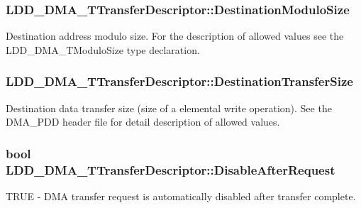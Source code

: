 \subsubsection[{Destination\+Modulo\+Size}]{ L\+D\+D\+\_\+\+D\+M\+A\+\_\+\+T\+Transfer\+Descriptor\+::\+Destination\+Modulo\+Size}\label{struct_l_d_d___d_m_a___t_transfer_descriptor_a2d9a37eb9dc192ae554e0dca033a1e3e}
Destination address modulo size. For the description of allowed values see the L\+D\+D\+\_\+\+D\+M\+A\+\_\+\+T\+Modulo\+Size type declaration. \hypertarget{struct_l_d_d___d_m_a___t_transfer_descriptor_aab2978b1b8d4a4774a5e2c298d58479f}{}
\subsubsection[{Destination\+Transfer\+Size}]{ L\+D\+D\+\_\+\+D\+M\+A\+\_\+\+T\+Transfer\+Descriptor\+::\+Destination\+Transfer\+Size}\label{struct_l_d_d___d_m_a___t_transfer_descriptor_aab2978b1b8d4a4774a5e2c298d58479f}
Destination data transfer size (size of a elemental write operation). See the D\+M\+A\+\_\+\+P\+D\+D header file for detail description of allowed values. \hypertarget{struct_l_d_d___d_m_a___t_transfer_descriptor_af47462df9934c927bd3cb1c8c7a4aa94}{}
\subsubsection[{Disable\+After\+Request}]{\setlength{\rightskip}{0pt plus 5cm}bool L\+D\+D\+\_\+\+D\+M\+A\+\_\+\+T\+Transfer\+Descriptor\+::\+Disable\+After\+Request}\label{struct_l_d_d___d_m_a___t_transfer_descriptor_af47462df9934c927bd3cb1c8c7a4aa94}
T\+R\+U\+E -\/ D\+M\+A transfer request is automatically disabled after transfer complete. \hypertarget{struct_l_d_d___d_m_a___t_transfer_descriptor_a2f0b8713587bb922b1f8743a52473ff6}{}
